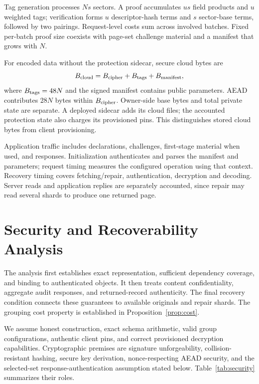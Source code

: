 \documentclass[10pt,journal]{IEEEtran}
\begin{document}
Tag generation processes $Ns$ sectors. A proof accumulates $us$ field
products and $u$ weighted tags; verification forms $u$ descriptor-hash terms
and $s$ sector-base terms, followed by two pairings. Request-level costs sum
across involved batches. Fixed per-batch proof size coexists with page-set
challenge material and a manifest that grows with $N$.

For encoded data without the protection sidecar, secure cloud bytes are
\begin{equation}\label{eq:cloud-cost}
B_{\rm cloud}=B_{\rm cipher}+B_{\rm tags}+B_{\rm manifest},
\end{equation}
where $B_{\rm tags}=48N$ and the signed manifest contains public parameters.
AEAD contributes $28N$ bytes within $B_{\rm cipher}$. Owner-side base bytes
and total private state are separate. A deployed sidecar adds its cloud
files; the accounted protection state also charges its provisioned pins.
This distinguishes stored cloud bytes from client provisioning.

Application traffic includes declarations, challenges, first-stage material
when used, and responses. Initialization authenticates and parses the
manifest and parameters; request timing measures the configured operation
using that context. Recovery timing covers fetching/repair, authentication,
decryption and decoding. Server reads and application replies are separately
accounted, since repair may read several shards to produce one returned page.

\section{Security and Recoverability Analysis}\label{sec:security}
The analysis first establishes exact representation, sufficient dependency
coverage, and binding to authenticated objects. It then treats content
confidentiality, aggregate audit responses, and returned-record authenticity.
The final recovery condition connects these guarantees to available originals
and repair shards. The grouping cost property is established in
Proposition~\ref{prop:cost}.

We assume honest
construction, exact schema arithmetic, valid group configurations, authentic
client pins, and correct provisioned decryption capabilities. Cryptographic
premises are signature unforgeability, collision-resistant hashing, secure
key derivation, nonce-respecting AEAD security, and the selected-set response-authentication
assumption stated below. Table~\ref{tab:security} summarizes their roles.
\end{document}
